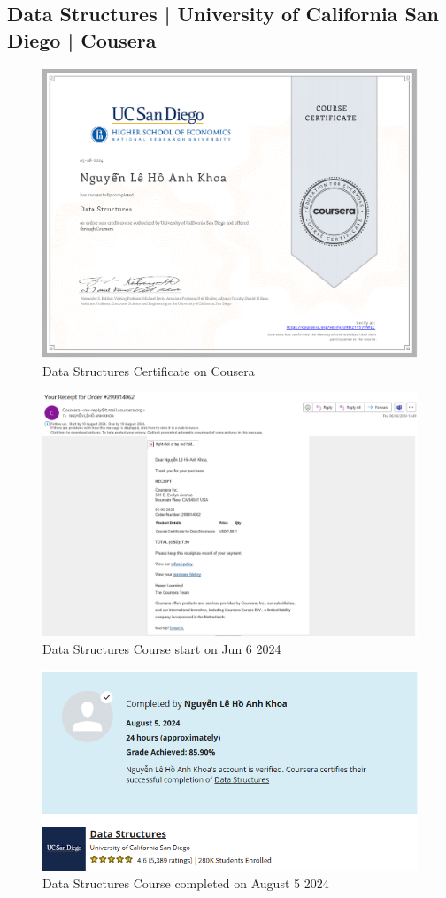 \subsection{Data Structures |
	University of California San Diego | Cousera}
\begin{figure}[H]
	\centering
	\includegraphics[width=0.7\linewidth]{img/Cert02.png}
	\caption{Data Structures Certificate on Cousera}
	\label{fig:datastructures}
\end{figure}

\begin{figure}[H]
	\centering
	\includegraphics[width=0.7\linewidth]{img/Capture03.PNG}
	\caption{Data Structures Course start on Jun 6 2024}
	\label{fig:algorithmtoolbox}
\end{figure}

\begin{figure}[H]
	\centering
	\includegraphics[width=0.7\linewidth]{img/Capture04.PNG}
	\caption{Data Structures Course completed on August 5 2024}
	\label{fig:algorithmtoolbox}
\end{figure}

